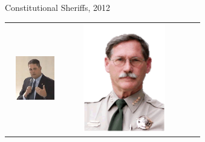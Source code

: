 \begin{frame}{Constitutional Sheriffs, 2012}
\begin{table}[h]
\begin{tabular}{cccc}
    \includegraphics[width=0.75\textwidth,height=.24\textheight,keepaspectratio=true]{img/s9.png} &
    \includegraphics[width=0.75\textwidth,height=.24\textheight,keepaspectratio=true]{img/gil-gilbertson.png} \\
\end{tabular}
\end{table}
\end{frame}

